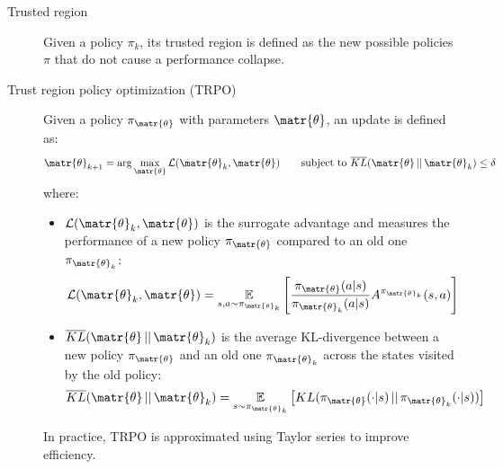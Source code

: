 \begin{description}
    \item[Trusted region] 
        Given a policy $\pi_k$, its trusted region is defined as the new possible policies $\pi$ that do not cause a performance collapse.
\end{description}

\begin{description}
    \item[Trust region policy optimization (TRPO)] 
        Given a policy $\pi_\matr{\theta}$ with parameters $\matr{\theta}$, an update is defined as:
        \[ \matr{\theta}_{k+1} = \arg\max_\matr{\theta} \mathcal{L}(\matr{\theta}_k, \matr{\theta}) \hspace{2em} \text{subject to } \overline{KL}(\matr{\theta} \,||\, \matr{\theta}_k) \leq \delta \]
        where:
        \begin{itemize}
            \item $\mathcal{L}(\matr{\theta}_k, \matr{\theta})$ is the surrogate advantage and measures the performance of a new policy $\pi_\matr{\theta}$ compared to an old one $\pi_{\matr{\theta}_k}$:
            \[ \mathcal{L}(\matr{\theta}_k, \matr{\theta}) = \underset{s, a \sim \pi_{\matr{\theta}_k}}{\mathbb{E}} \left[ \frac{\pi_\matr{\theta}(a | s)}{\pi_{\matr{\theta}_k}(a | s)} A^{\pi_{\matr{\theta}_k}}(s, a) \right] \]

            \item $\overline{KL}(\matr{\theta} \,||\, \matr{\theta}_k)$ is the average KL-divergence between a new policy $\pi_\matr{\theta}$ and an old one $\pi_{\matr{\theta}_k}$ across the states visited by the old policy:
            \[ \overline{KL}(\matr{\theta} \,||\, \matr{\theta}_k) = \underset{s \sim \pi_{\matr{\theta}_k}}{\mathbb{E}} \left[ KL(\pi_\matr{\theta}(\cdot | s) \,||\, \pi_{\matr{\theta}_k}(\cdot | s)) \right] \]
        \end{itemize}

        \begin{remark}
            In practice, TRPO is approximated using Taylor series to improve efficiency.
        \end{remark}


\end{description}
